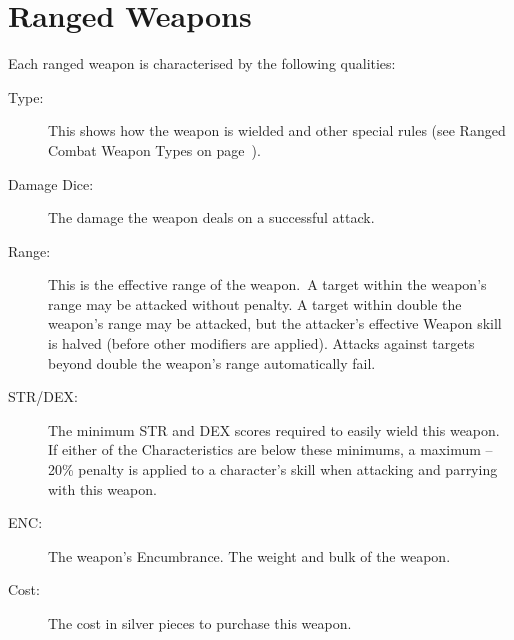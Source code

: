 \section{Ranged Weapons}
Each ranged weapon is characterised by the following qualities:
\begin{description}
	\item[Type:] This shows how the weapon is wielded and other special rules (see Ranged Combat Weapon Types on page~\pageref{sssec:ranged-combat-weapon-types}).
	\item[Damage Dice:] The damage the weapon deals on a successful attack. 
	\item[Range:] This is the effective range of the weapon. A target within the weapon’s range may be attacked without penalty. A target within double the weapon’s range may be attacked, but the attacker’s effective Weapon skill is halved (before other modifiers are applied). Attacks against targets beyond double the weapon’s range automatically fail.
	\item[STR/DEX:] The minimum STR and DEX scores required to easily wield this weapon. If either of the Characteristics are below these minimums, a maximum –20\% penalty is applied to a character’s skill when attacking and parrying with this weapon.
	\item[ENC:] The weapon’s Encumbrance. The weight and bulk of the weapon. 
	\item[Cost:] The cost in silver pieces to purchase this weapon.
\end{description}


